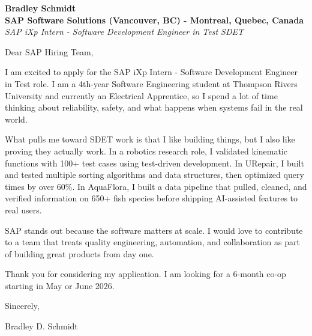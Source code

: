 \documentclass[11pt]{article}
\begin{document}
\textbf{Bradley Schmidt}\\
\vspace{0.5em}
\textbf{SAP Software Solutions (Vancouver, BC) - Montreal, Quebec, Canada}\\
\textit{SAP iXp Intern - Software Development Engineer in Test SDET}

Dear SAP Hiring Team,

\par

I am excited to apply for the SAP iXp Intern - Software Development Engineer in Test role. I am a 4th-year Software Engineering student at Thompson Rivers University and currently an Electrical Apprentice, so I spend a lot of time thinking about reliability, safety, and what happens when systems fail in the real world.

\par

What pulls me toward SDET work is that I like building things, but I also like proving they actually work. In a robotics research role, I validated kinematic functions with 100+ test cases using test-driven development. In URepair, I built and tested multiple sorting algorithms and data structures, then optimized query times by over 60\%. In AquaFlora, I built a data pipeline that pulled, cleaned, and verified information on 650+ fish species before shipping AI-assisted features to real users.

\par

SAP stands out because the software matters at scale. I would love to contribute to a team that treats quality engineering, automation, and collaboration as part of building great products from day one.

\par

Thank you for considering my application. I am looking for a 6-month co-op starting in May or June 2026.

\par

Sincerely,

\par

Bradley D. Schmidt
\end{document}
